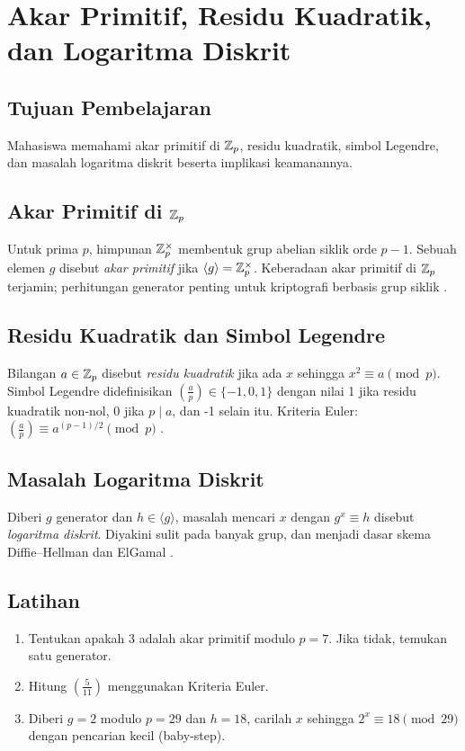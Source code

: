 \documentclass[../main.tex]{subfiles}
\begin{document}
\chapter{Akar Primitif, Residu Kuadratik, dan Logaritma Diskrit}

\section{Tujuan Pembelajaran}
Mahasiswa memahami akar primitif di \(\mathbb{Z}_p\), residu kuadratik, simbol Legendre, dan masalah logaritma diskrit beserta implikasi keamanannya.

\section{Akar Primitif di \(\mathbb{Z}_p\)}
Untuk prima \(p\), himpunan \(\mathbb{Z}_p^\times\) membentuk grup abelian siklik orde \(p-1\). Sebuah elemen \(g\) disebut \emph{akar primitif} jika \(\langle g\rangle = \mathbb{Z}_p^\times\). Keberadaan akar primitif di \(\mathbb{Z}_p\) terjamin; perhitungan generator penting untuk kriptografi berbasis grup siklik \citep{hoffstein}.

\section{Residu Kuadratik dan Simbol Legendre}
Bilangan \(a\in\mathbb{Z}_p\) disebut \emph{residu kuadratik} jika ada \(x\) sehingga \(x^2\equiv a\pmod p\). Simbol Legendre didefinisikan \(\left(\tfrac{a}{p}\right)\in\{-1,0,1\}\) dengan nilai 1 jika residu kuadratik non-nol, 0 jika \(p\mid a\), dan -1 selain itu. Kriteria Euler: \(\left(\tfrac{a}{p}\right)\equiv a^{(p-1)/2}\pmod p\) \citep{hoffstein}.

\section{Masalah Logaritma Diskrit}
Diberi \(g\) generator dan \(h\in\langle g\rangle\), masalah mencari \(x\) dengan \(g^x\equiv h\) disebut \emph{logaritma diskrit}. Diyakini sulit pada banyak grup, dan menjadi dasar skema Diffie--Hellman dan ElGamal \citep{diffiehellman,hoffstein}.

\section{Latihan}
\begin{enumerate}
  \item Tentukan apakah \(3\) adalah akar primitif modulo \(p=7\). Jika tidak, temukan satu generator.
  \item Hitung \(\left(\tfrac{5}{11}\right)\) menggunakan Kriteria Euler.
  \item Diberi \(g=2\) modulo \(p=29\) dan \(h=18\), carilah \(x\) sehingga \(2^x\equiv 18\pmod{29}\) dengan pencarian kecil (baby-step).
\end{enumerate}
\end{document}
